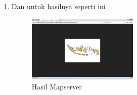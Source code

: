 \begin {enumerate}
\item Dan untuk hasilnya seperti ini
\begin{figure}[ht]
	    \centerline{\includegraphics[width=0.50\textwidth]{figures/gambar11.JPG}}
	    \caption{Hasil Mapserver}
		\label{gambar11}
		\end{figure}
\end{enumerate}
